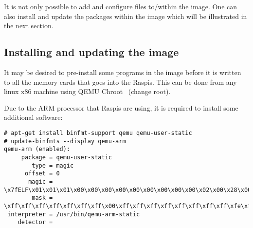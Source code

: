 %


It is not only possible to add and configure files to/within the image. One can
also install and update the packages within the image which will be illustrated
in the next section.

\subsection{Installing and updating the image}

It may be desired to pre-install some programs in the image before it is
written to all the memory cards that goes into the \ac{Raspi}s.
This can be done from any linux x86 machine using QEMU Chroot~\cite{QemuUserEmulation}
(change root).

Due to the \ac{ARM} processor that \ac{Raspi}s are using, it is required to
install some additional software:

\begin{lstlisting}[]
# apt-get install binfmt-support qemu qemu-user-static
# update-binfmts --display qemu-arm
qemu-arm (enabled):
     package = qemu-user-static
        type = magic
      offset = 0
       magic = \x7fELF\x01\x01\x01\x00\x00\x00\x00\x00\x00\x00\x00\x00\x02\x00\x28\x00
        mask = \xff\xff\xff\xff\xff\xff\xff\x00\xff\xff\xff\xff\xff\xff\xff\xff\xfe\xff\xff\xff
 interpreter = /usr/bin/qemu-arm-static
    detector =
\end{lstlisting}
\FloatBarrier
\vspace{-5mm}

